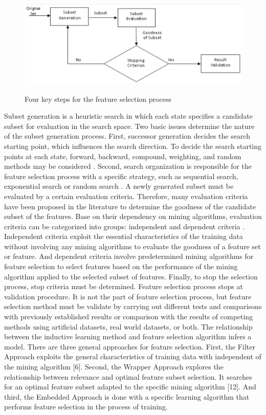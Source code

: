 \documentclass[document.tex]{subfiles}
\begin{document}
\begin{figure}[H]
	\begin{center}
		\includegraphics[height=5.0cm]{imgs/Feature_mining.png}
	\end{center}
	\caption{Four key steps for the feature selection process}
	\label{fig:Four key steps for the feature selection process}
\end{figure}
Subset generation is a heuristic search in which each state specifies a candidate subset
for evaluation in the search space. Two basic issues determine the nature of the subset
generation process. First, successor generation decides the search starting point, which
influences the search direction. To decide the search starting points at each state, forward,
backward, compound, weighting, and random methods may be considered . Second,
search organization is responsible for the feature selection process with a specific strategy,
such as sequential search, exponential search or random search . A newly generated subset
must be evaluated by a certain evaluation criteria. Therefore, many evaluation criteria
have been proposed in the literature to determine the goodness of the candidate subset
of the features. Base on their dependency on mining algorithms, evaluation criteria can
be categorized into groups: independent and dependent criteria . Independent criteria
exploit the essential characteristics of the training data without involving any mining
algorithms to evaluate the goodness of a feature set or feature. And dependent criteria
involve predetermined mining algorithms for feature selection to select features based
on the performance of the mining algorithm applied to the selected subset of features.
Finally, to stop the selection process, stop criteria must be determined. Feature selection
process stops at validation procedure. It is not the part of feature selection process, but
feature selection method must be validate by carrying out different tests and comparisons
with previously established results or comparison with the results of competing methods
using artificial datasets, real world datasets, or both.
The relationship between the inductive learning method and feature selection algorithm
infers a model. There are three general approaches for feature selection. First, the Filter
Approach exploits the general characteristics of training data with independent of the
mining algorithm [6]. Second, the Wrapper Approach explores the relationship between
relevance and optimal feature subset selection. It searches for an optimal feature subset
adapted to the specific mining algorithm [12]. And third, the Embedded Approach is
done with a specific learning algorithm that performs feature selection in the process of
training.
\end{document}
